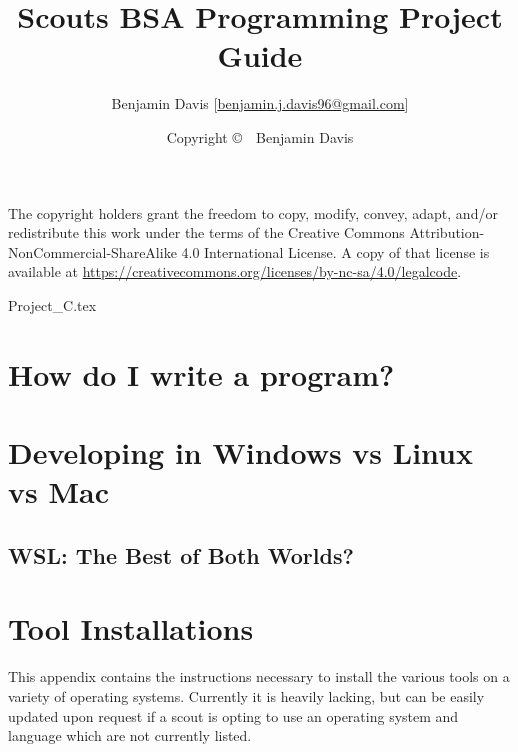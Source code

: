 \documentclass[letterpaper,12pt]{book}
\title{Scouts BSA Programming Project Guide}
\author{
  Benjamin Davis [\href{mailto:benjamin.j.davis96@gmail.com}{benjamin.j.davis96@gmail.com}]
}
\date{Copyright \copyright\ \the\year\ Benjamin Davis}
\begin{document}
  \pagestyle{simple}
  \maketitle
  
  \begin{center}
    \vspace*{\fill}
    The copyright holders grant the freedom to copy, modify, convey, adapt, and/or redistribute this work
    under the terms of the Creative Commons Attribution-NonCommercial-ShareAlike 4.0
    International License. A copy of that license is available at
    \url{https://creativecommons.org/licenses/by-nc-sa/4.0/legalcode}.
    \vspace*{\fill}
  \end{center}

  \frontmatter
  \pagestyle{plain}

  \tableofcontents

  \mainmatter

  

  

  

  

  {Project_C.tex}

\appendix

  \chapter{How do I write a program?}
  \label{app:how_do_i_write_a_program}

  \chapter{Developing in Windows vs Linux vs Mac}
  \label{app:dev_os}

    \section{WSL: The Best of Both Worlds?}

  \chapter{Tool Installations}
  \label{app:tool_installations}
    This appendix contains the instructions necessary to install the various tools on a variety of operating
      systems.
    Currently it is heavily lacking, but can be easily updated upon request if a scout is opting to use
      an operating system and language which are not currently listed.
\end{document}
